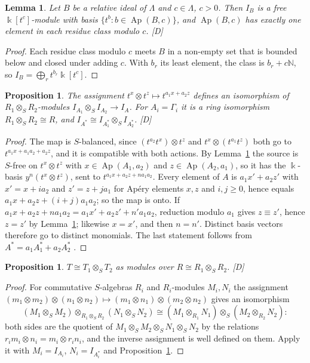 \documentclass[11pt]{article}
\newtheorem{proposition}[theorem]{Proposition}
\newtheorem{lemma}[theorem]{Lemma}
\theoremstyle{definition}
\theoremstyle{remark}
\newcommand{\N}{\mathbb{N}}
\newcommand{\kk}{\Bbbk}
\newcommand{\Ap}{\operatorname{Ap}}
\newcommand{\mD}{\emph{[D]}}
\begin{document}
\begin{lemma}\label{lem:apery}
Let $B$ be a relative ideal of $\Lambda$ and $c\in\Lambda$, $c>0$. Then $I_B$ is a free
$\kk[t^c]$-module with basis $\{t^b:b\in\Ap(B,c)\}$, and $\Ap(B,c)$ has exactly one element in each
residue class modulo $c$. \mD{}
\end{lemma}

\begin{proof}
Each residue class modulo $c$ meets $B$ in a non-empty set that is bounded below and closed under
adding $c$. With $b_r$ its least element, the class is $b_r+c\N$, so $I_B=\bigoplus_r t^{b_r}\kk[t^c]$.
\end{proof}

\begin{proposition}\label{prop:iso}
The assignment $t^x\otimes t^z\mapsto t^{a_1x+a_2z}$ defines an isomorphism of
$R_1\otimes_SR_2$-modules $I_{A_1}\otimes_SI_{A_2}\to I_A$. For $A_i=\Gamma_i$ it is a ring isomorphism
$R_1\otimes_SR_2\cong R$, and $I_{A^*}\cong I_{A_1^*}\otimes_SI_{A_2^*}$. \mD{}
\end{proposition}

\begin{proof}
The map is $S$-balanced, since $(t^{a_2}t^x)\otimes t^z$ and $t^x\otimes(t^{a_1}t^z)$ both go to
$t^{a_1x+a_1a_2+a_2z}$, and it is compatible with both actions. By Lemma~\ref{lem:apery} the source is
$S$-free on $t^x\otimes t^z$ with $x\in\Ap(A_1,a_2)$ and $z\in\Ap(A_2,a_1)$, so it has the $\kk$-basis
$y^n(t^x\otimes t^z)$, sent to $t^{a_1x+a_2z+na_1a_2}$. Every element of $A$ is $a_1x'+a_2z'$ with
$x'=x+ia_2$ and $z'=z+ja_1$ for Ap\'ery elements $x,z$ and $i,j\ge0$, hence equals
$a_1x+a_2z+(i+j)a_1a_2$; so the map is onto. If $a_1x+a_2z+na_1a_2=a_1x'+a_2z'+n'a_1a_2$, reduction
modulo $a_1$ gives $z\equiv z'$, hence $z=z'$ by Lemma~\ref{lem:apery}; likewise $x=x'$, and then
$n=n'$. Distinct basis vectors therefore go to distinct monomials. The last statement follows from
$A^*=a_1A_1^*+a_2A_2^*$ \cite[Lemma~8(9)]{GarciaSanchezLeamer2013}.
\end{proof}

\begin{proposition}\label{prop:tensor}
$T\cong T_1\otimes_ST_2$ as modules over $R\cong R_1\otimes_SR_2$. \mD{}
\end{proposition}

\begin{proof}
For commutative $S$-algebras $R_i$ and $R_i$-modules $M_i,N_i$ the assignment
$(m_1\otimes m_2)\otimes(n_1\otimes n_2)\mapsto(m_1\otimes n_1)\otimes(m_2\otimes n_2)$ gives an
isomorphism
\[
(M_1\otimes_SM_2)\otimes_{R_1\otimes_SR_2}(N_1\otimes_SN_2)\cong(M_1\otimes_{R_1}N_1)\otimes_S(M_2\otimes_{R_2}N_2):
\]
both sides are the quotient of $M_1\otimes_SM_2\otimes_SN_1\otimes_SN_2$ by the relations
$r_im_i\otimes n_i=m_i\otimes r_in_i$, and the inverse assignment is well defined on them. Apply it with
$M_i=I_{A_i}$, $N_i=I_{A_i^*}$ and Proposition~\ref{prop:iso}.
\end{proof}
\end{document}
